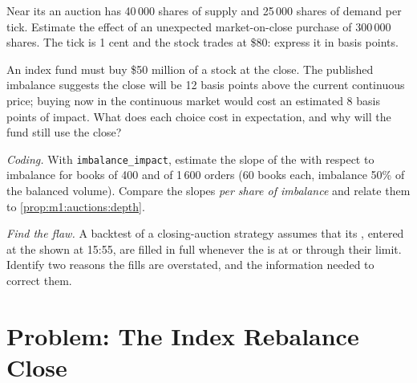 \begin{exercise}[$\star\star$]\label{exo:m1:auctions:5}
Near its  an auction has 40\,000 shares of supply and 25\,000
shares of demand per tick. Estimate the effect of an unexpected
market-on-close purchase of 300\,000 shares. The tick is 1 cent and the stock
trades at \$80: express it in basis points.
\end{exercise}

\begin{exercise}[$\star\star$]\label{exo:m1:auctions:6}
An index fund must buy \$50 million of a stock at the close. The published
imbalance suggests the close will be 12 basis points above the current
continuous price; buying now in the continuous market would cost an estimated
8 basis points of impact. What does each choice cost in expectation, and why
will the fund still use the close?
\end{exercise}

\begin{exercise}[$\star\star\star$]\label{exo:m1:auctions:7}
\emph{Coding.} With \texttt{imbalance\_impact}, estimate the slope of the
 with respect to imbalance for books of 400 and of 1\,600
orders (60 books each, imbalance 50\% of the balanced volume). Compare the
slopes \emph{per share of imbalance} and relate them to
\cref{prop:m1:auctions:depth}.
\end{exercise}

\begin{exercise}[$\star\star\star$]\label{exo:m1:auctions:8}
\emph{Find the flaw.} A backtest of a closing-auction strategy assumes that
its , entered at the  shown at 15:55,
are filled in full whenever the  is at or through their limit.
Identify two reasons the fills are overstated, and the information needed to
correct them.
\end{exercise}

\section{Problem: The Index Rebalance Close}

